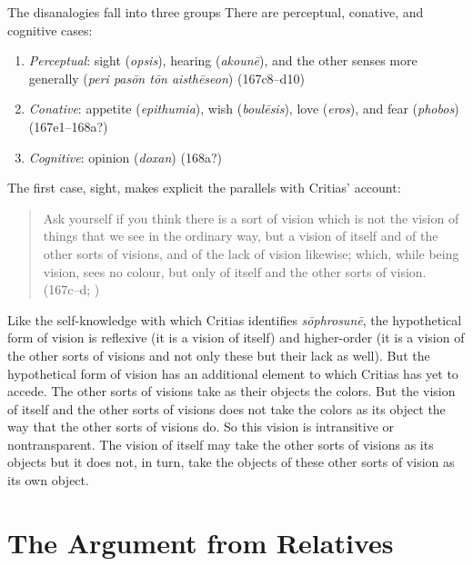 The disanalogies fall into three groups There are perceptual, conative, and cognitive cases:
\begin{enumerate}[(1)]
	\item \emph{Perceptual}: sight (\emph{opsis}), hearing (\emph{akounē}), and the other senses more generally (\emph{peri pasōn tōn aisthēseon}) (167c8–d10)
	\item \emph{Conative}: appetite (\emph{epithumia}), wish (\emph{boulēsis}), love (\emph{eros}), and fear (\emph{phobos}) (167e1–168a?)
	\item \emph{Cognitive}: opinion (\emph{doxan}) (168a?)
\end{enumerate}

The first case, sight, makes explicit the parallels with Critias' account:
\begin{quote}
	Ask yourself if you think there is a sort of vision which is not the vision of things that we see in the ordinary way, but a vision of itself and of the other sorts of visions, and of the lack of vision likewise; which, while being vision, sees no colour, but only of itself and the other sorts of vision. (167c–d; \citealt[59]{Lamb:1927qw})
\end{quote}
Like the self-knowledge with which Critias identifies \emph{sōphrosunē}, the hypothetical form of vision is reflexive (it is a vision of itself) and higher-order (it is a vision of the other sorts of visions and not only these but their lack as well). But the hypothetical form of vision has an additional element to which Critias has yet to accede. The other sorts of visions take as their objects the colors. But the vision of itself and the other sorts of visions does not take the colors as its object the way that the other sorts of visions do. So this vision is intransitive or nontransparent. The vision of itself may take the other sorts of visions as its objects but it does not, in turn, take the objects of these other sorts of vision as its own object.


\section{The Argument from Relatives} %
\label{sec:the_argument_from_relatives}





